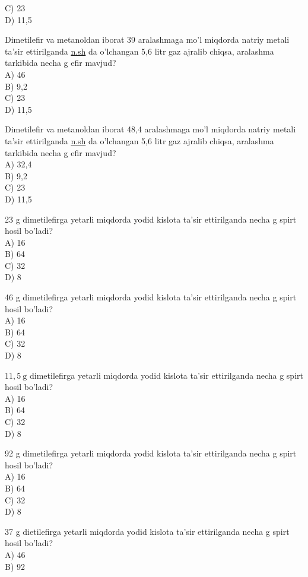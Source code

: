 C) 23\\
D) 11,5
  \item Dimetilefir va metanoldan iborat 39 aralashmaga mo'l miqdorda natriy metali ta'sir ettirilganda \href{http://n.sh}{n.sh} da o'lchangan 5,6 litr gaz ajralib chiqsa, aralashma tarkibida necha g efir mavjud?\\
A) 46\\
B) 9,2\\
C) 23\\
D) 11,5
  \item Dimetilefir va metanoldan iborat 48,4 aralashmaga mo'l miqdorda natriy metali ta'sir ettirilganda \href{http://n.sh}{n.sh} da o'lchangan 5,6 litr gaz ajralib chiqsa, aralashma tarkibida necha g efir mavjud?\\
A) 32,4\\
B) 9,2\\
C) 23\\
D) 11,5
  \item 23 g dimetilefirga yetarli miqdorda yodid kislota ta'sir ettirilganda necha g spirt hosil bo'ladi?\\
A) 16\\
B) 64\\
C) 32\\
D) 8
  \item 46 g dimetilefirga yetarli miqdorda yodid kislota ta'sir ettirilganda necha g spirt hosil bo'ladi?\\
A) 16\\
B) 64\\
C) 32\\
D) 8
  \item $11,5 \mathrm{~g}$ dimetilefirga yetarli miqdorda yodid kislota ta'sir ettirilganda necha g spirt hosil bo'ladi?\\
A) 16\\
B) 64\\
C) 32\\
D) 8
  \item 92 g dimetilefirga yetarli miqdorda yodid kislota ta'sir ettirilganda necha g spirt hosil bo'ladi?\\
A) 16\\
B) 64\\
C) 32\\
D) 8
  \item 37 g dietilefirga yetarli miqdorda yodid kislota ta'sir ettirilganda necha g spirt hosil bo'ladi?\\
A) 46\\
B) 92\\

